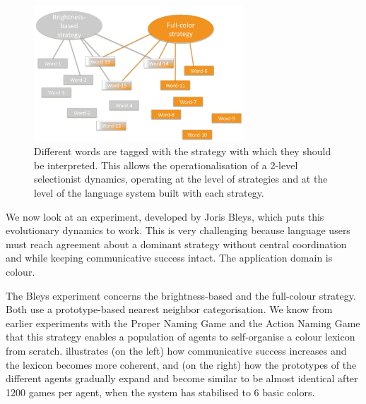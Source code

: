 \begin{figure}[htb!]
	\begin{center}
		\includegraphics[width=0.70\textwidth]{chap12/figs/strats.pdf} \end{center}
		\caption{{Different words are tagged with the strategy with which they 
should be interpreted. This allows the operationalisation of a 2-level selectionist dynamics, operating at 
the level of strategies and at the level of the language system built with each strategy.
\label{fig:tagging}
}}
\end{figure}

We now look at an experiment, developed by Joris Bleys, which puts 
this evolutionary dynamics to work. This is very challenging because language users must reach 
agreement about a dominant strategy without central coordination and while keeping communicative success intact. 
The application domain is colour. 

The Bleys experiment concerns the brightness-based and the full-colour strategy. Both use 
a prototype-based nearest neighbor categorisation. We know from earlier experiments with the Proper Naming Game
and the Action Naming Game that this strategy enables a population of agents 
to self-organise a colour lexicon from scratch.  illustrates (on the left) how 
communicative success increases and the lexicon becomes more coherent, and (on the right) how the prototypes
of the different agents gradually expand and become similar to be almost identical after 1200 games per agent, when 
the system has stabilised to 6 basic colors. 


